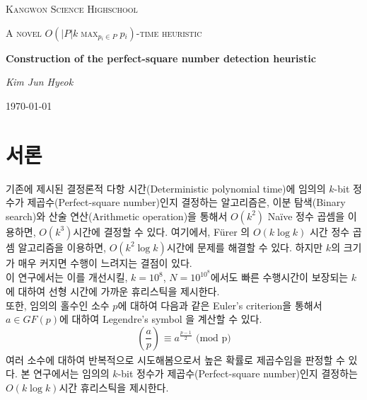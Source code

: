 \documentclass[a4paper]{article}
\newcommand{\Leg}[3][]{\left(\frac{#2}{#3}\right)_{#1}}
\begin{document}
    \begin{titlepage}
        \centering
	    {\scshape\LARGE Kangwon Science Highschool \par}
	    \vspace{1cm}
	    {\scshape\Large A novel $O(|P|k\max_{p_i \in P}{p_i})$-time heuristic\par}
        \vspace{1.5cm}
	    {\huge\bfseries Construction of the perfect-square number detection heuristic\par}
	    \vspace{2cm}
	    {\Large\itshape Kim Jun Hyeok\par}
	    \vfill
	    {\large \today\par}
    \end{titlepage}
    \linespread{1.5}
    \begin{abstract}
        기존에 이분 탐색과 산술(Arithmetic) 연산을 이용하여 제시되었던 $k$-bit 정수에 대하여 $O(k^{3})$혹은 $O(k^{2}\log{k})$시간 결정론적 알고리즘은 매우 큰 수에 대해서는 시간이 오래 걸리는 결점이 있다.
        이 연구에서는, 빅데이터 분석을 통해서 임의의 홀수인 소수에 관한 이차 잉여(Quadratic-residue)에 대하여 Euler’s criterion 을 이용한 완전 제곱수 휴리스틱(Heuristic) 제시와 유의미한 높은 확률로 판정 가능한 소수들의 최소 개수를 제시하는 것을 목표로 한다. 
        또한, 후속 연구 방안으로 임의의 제곱수를 비트로 표현하였을 때 임의의 개수의 제곱수에 관하여 LCS(Longest-common- sequence)를 구하여 여기에서 찾은 LCS 를 통해서 매칭하는 휴리스틱을 제시하고, 위의 방법과 결합하여 더욱 판정률을 높인다.
    \end{abstract}
    \tableofcontents
    \newpage
    \section{서론}
        기존에 제시된 결정론적 다항 시간(Deterministic polynomial time)에 임의의 $k$-bit 정수가 제곱수(Perfect-square number)인지 결정하는 알고리즘은, 이분 탐색(Binary search)와 산술 연산(Arithmetic operation)을 통해서 $O(k^{2})$ Naïve 정수 곱셈을 이용하면, $O(k^{3})$시간에 결정할 수 있다.
        여기에서, Fürer 의 $O(k\log{k})$ 시간 정수 곱셈 알고리즘을 이용하면, $O(k^{2}\log{k})$시간에 문제를 해결할 수 있다. \cite{fürer_2007}
        하지만 $k$의 크기가 매우 커지면 수행이 느려지는 결점이 있다. \\
        이 연구에서는 이를 개선시킬, $k=10^{8}$, $N=10^{10^{8}}$에서도 빠른 수행시간이 보장되는 $k$에 대하여 선형 시간에 가까운 휴리스틱을 제시한다. \\
        또한, 임의의 홀수인 소수 $p$에 대하여 다음과 같은 Euler’s criterion을 통해서 $a \in GF(p)$에 대하여 Legendre’s symbol 을 계산할 수 있다. \cite{hardy_heath-brown_wright_2011}
        \[
            \Leg{a}{p} \equiv a^{\frac{p-1}{2}} \text{ (mod p)}
        \]
        여러 소수에 대하여 반복적으로 시도해봄으로서 높은 확률로 제곱수임을 판정할 수 있다.
        본 연구에서는 임의의 $k$-bit 정수가 제곱수(Perfect-square number)인지 결정하는 $O(k\log{k})$시간 휴리스틱을 제시한다.
\end{document}
